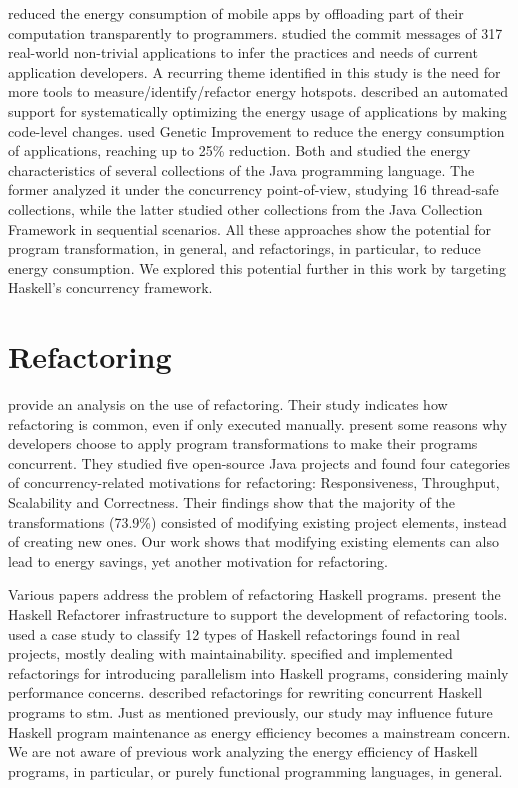  reduced the energy consumption of mobile apps by offloading part of their computation transparently to programmers.  studied the commit messages of 317 real-world non-trivial applications to infer the practices and needs of current application developers. A recurring theme identified in this study is the need for more tools to measure/identify/refactor energy hotspots.  described an automated support for systematically optimizing the energy usage of applications by making code-level changes.  used Genetic Improvement to reduce the energy consumption of applications, reaching up to 25\% reduction. Both  and  studied the energy characteristics of several collections of the Java programming language. The former analyzed it under the concurrency point-of-view, studying 16 thread-safe collections, while the latter studied other collections from the Java Collection Framework in sequential scenarios. All these approaches show the potential for program transformation, in general, and refactorings, in particular, to reduce energy consumption. We explored this potential further in this work by targeting Haskell's concurrency framework.


\section{Refactoring}
 provide an analysis on the use of refactoring. Their study indicates how refactoring is common, even if only executed manually.  present some reasons why developers choose to apply program transformations to make their programs concurrent. They studied five open-source Java projects and found four categories of concurrency-related motivations for refactoring: Responsiveness, Throughput, Scalability and Correctness. Their findings show that the majority of the transformations (73.9\%) consisted of modifying existing project elements, instead of creating new ones. Our work shows that modifying existing elements can also lead to energy savings, yet another motivation for refactoring.

Various papers address the problem of refactoring Haskell programs.  present the Haskell Refactorer infrastructure to support the development of refactoring tools.  used a case study to classify 12 types of Haskell refactorings found in real projects, mostly dealing with maintainability.  specified and implemented refactorings for introducing parallelism into Haskell programs, considering mainly performance concerns.  described refactorings for rewriting concurrent Haskell programs to \ac{stm}. Just as mentioned previously, our study may influence future Haskell program maintenance as energy efficiency becomes a mainstream concern. We are not aware of previous work analyzing the energy efficiency of Haskell programs, in particular, or purely functional programming languages, in general.
